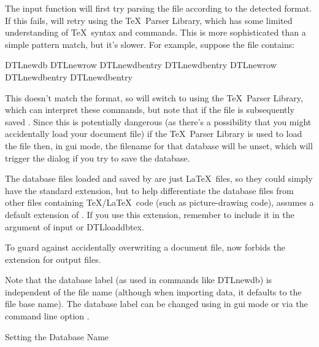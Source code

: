The  input function will first try parsing the file
according to the detected format.  If this fails, 
will retry using the \TeX\ Parser Library, which has some limited
understanding of \TeX\ syntax and  commands.
This is more sophisticated than a simple pattern match, but it's slower.
For example, suppose the file contains:
\begin{codebox*}
\gls{DTLnewdb}
\gls{DTLnewrow}
\gls{DTLnewdbentry}
\gls{DTLnewdbentry}
\gls{DTLnewrow}
\gls{DTLnewdbentry}
\gls{DTLnewdbentry}
\end{codebox*}
This doesn't match the  format, so  will
switch to using the \TeX\ Parser Library, which can interpret these
commands, but note that if the file is subsequently saved
. Since this is
potentially dangerous (as there's a possibility that you might
accidentally load your document  file) if the 
\TeX\ Parser Library is used to load the file then, in \gls{gui}
mode, the filename for that database will be unset, which will 
trigger the  dialog if you try to save the database.

The  database files loaded and saved by 
are just \LaTeX\ files, so they could simply have the standard
 extension, but to help differentiate the database files
from other files containing \TeX\slash \LaTeX\ code (such as picture-drawing
code),  assumes a default extension of .
If you use this extension, remember to include it in the argument of
\gls{input} or \gls{DTLloaddbtex}.

\begin{information}
To guard against accidentally overwriting a document file, 
now forbids the  extension for output files.
\end{information}

Note that the database label (as used in commands like \gls{DTLnewdb})
is independent of the file name (although when importing data, it defaults 
to the file base name).  The database label can be changed using 
 in 
\gls{gui} mode or via the command line option 
.

{
}
{Setting the Database Name}

